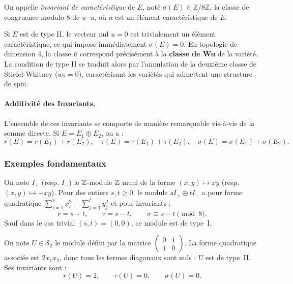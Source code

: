 \begin{definition}
On appelle \emph{invariant de caractéristique} de $E$, noté $\sigma(E) \in \mathbb{Z}/8\mathbb{Z}$, la classe de congruence modulo 8 de $u \cdot u$, où $u$ est un élément caractéristique de $E$.
\end{definition}

\begin{remark}
Si $E$ est de type II, le vecteur nul $u = 0$ est trivialement un élément caractéristique, ce qui impose immédiatement $\sigma(E) = 0$. En topologie de dimension 4, la classe $\bar{u}$ correspond précisément à la \textbf{classe de Wu} de la variété. La condition de type II se traduit alors par l'annulation de la deuxième classe de Stiefel-Whitney ($w_2 = 0$), caractérisant les variétés qui admettent une structure de spin.
\end{remark}

\paragraph{Additivité des Invariants.}
L'ensemble de ces invariants se comporte de manière remarquable vis-à-vis de la somme directe. Si $E = E_1 \oplus E_2$, on a :
\[
r(E) = r(E_1) + r(E_2), \quad \tau(E) = \tau(E_1) + \tau(E_2), \quad \sigma(E) = \sigma(E_1) + \sigma(E_2).
\]

\subsubsection{Exemples fondamentaux}

\begin{exemple}
On note $I_+$ (resp. $I_-$) le $\mathbb{Z}$-module $\mathbb{Z}$ muni de la forme
$(x,y) \mapsto xy$ (resp. $(x,y) \mapsto -xy$). Pour des entiers $s, t \geq 0$, le
module $sI_+ \oplus tI_-$ a pour forme quadratique $\sum_{i=1}^s x_i^2 - \sum_{j=1}^t y_j^2$
et pour invariants :
\[
  r = s+t, \qquad \tau = s-t, \qquad \sigma \equiv s-t \pmod{8}.
\]
Sauf dans le cas trivial $(s,t) = (0,0)$, ce module est de type~I.
\end{exemple}

\begin{exemple}
On note $U \in \mathcal{S}_2$ le module défini par la matrice
$\begin{pmatrix} 0 & 1 \\ 1 & 0 \end{pmatrix}$.
La forme quadratique associée est $2x_1 x_2$, donc tous les termes diagonaux sont
nuls : $U$ est de type~II. Ses invariants sont :
\[
  r(U) = 2, \qquad \tau(U) = 0,  \qquad \sigma(U) = 0.
\]
\end{exemple}

